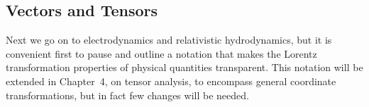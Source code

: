 
\subsection{Vectors and Tensors}\label{sec:2.5}

Next we go on to electrodynamics and relativistic hydrodynamics, but it is
convenient first to pause and outline a notation that makes the Lorentz
transformation properties of physical quantities transparent. This notation
will be extended in Chapter~4, on tensor analysis, to encompass general
coordinate transformations, but in fact few changes will be needed.

